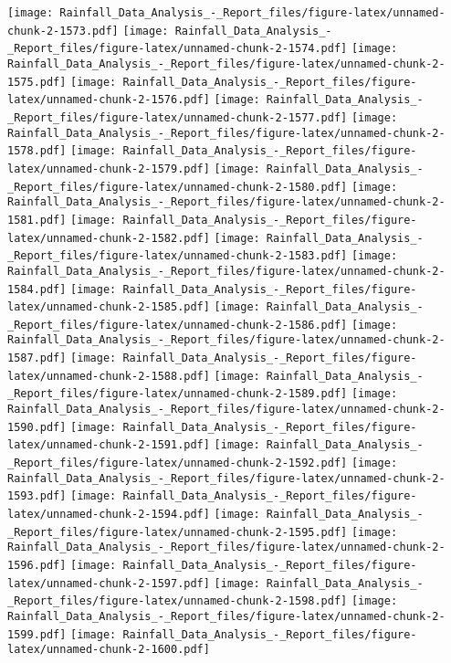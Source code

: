 \documentclass[
]{article}
\begin{document}
\texttt{[image: Rainfall\_Data\_Analysis\_-\_Report\_files/figure-latex/unnamed-chunk-2-1573.pdf]}
\texttt{[image: Rainfall\_Data\_Analysis\_-\_Report\_files/figure-latex/unnamed-chunk-2-1574.pdf]}
\texttt{[image: Rainfall\_Data\_Analysis\_-\_Report\_files/figure-latex/unnamed-chunk-2-1575.pdf]}
\texttt{[image: Rainfall\_Data\_Analysis\_-\_Report\_files/figure-latex/unnamed-chunk-2-1576.pdf]}
\texttt{[image: Rainfall\_Data\_Analysis\_-\_Report\_files/figure-latex/unnamed-chunk-2-1577.pdf]}
\texttt{[image: Rainfall\_Data\_Analysis\_-\_Report\_files/figure-latex/unnamed-chunk-2-1578.pdf]}
\texttt{[image: Rainfall\_Data\_Analysis\_-\_Report\_files/figure-latex/unnamed-chunk-2-1579.pdf]}
\texttt{[image: Rainfall\_Data\_Analysis\_-\_Report\_files/figure-latex/unnamed-chunk-2-1580.pdf]}
\texttt{[image: Rainfall\_Data\_Analysis\_-\_Report\_files/figure-latex/unnamed-chunk-2-1581.pdf]}
\texttt{[image: Rainfall\_Data\_Analysis\_-\_Report\_files/figure-latex/unnamed-chunk-2-1582.pdf]}
\texttt{[image: Rainfall\_Data\_Analysis\_-\_Report\_files/figure-latex/unnamed-chunk-2-1583.pdf]}
\texttt{[image: Rainfall\_Data\_Analysis\_-\_Report\_files/figure-latex/unnamed-chunk-2-1584.pdf]}
\texttt{[image: Rainfall\_Data\_Analysis\_-\_Report\_files/figure-latex/unnamed-chunk-2-1585.pdf]}
\texttt{[image: Rainfall\_Data\_Analysis\_-\_Report\_files/figure-latex/unnamed-chunk-2-1586.pdf]}
\texttt{[image: Rainfall\_Data\_Analysis\_-\_Report\_files/figure-latex/unnamed-chunk-2-1587.pdf]}
\texttt{[image: Rainfall\_Data\_Analysis\_-\_Report\_files/figure-latex/unnamed-chunk-2-1588.pdf]}
\texttt{[image: Rainfall\_Data\_Analysis\_-\_Report\_files/figure-latex/unnamed-chunk-2-1589.pdf]}
\texttt{[image: Rainfall\_Data\_Analysis\_-\_Report\_files/figure-latex/unnamed-chunk-2-1590.pdf]}
\texttt{[image: Rainfall\_Data\_Analysis\_-\_Report\_files/figure-latex/unnamed-chunk-2-1591.pdf]}
\texttt{[image: Rainfall\_Data\_Analysis\_-\_Report\_files/figure-latex/unnamed-chunk-2-1592.pdf]}
\texttt{[image: Rainfall\_Data\_Analysis\_-\_Report\_files/figure-latex/unnamed-chunk-2-1593.pdf]}
\texttt{[image: Rainfall\_Data\_Analysis\_-\_Report\_files/figure-latex/unnamed-chunk-2-1594.pdf]}
\texttt{[image: Rainfall\_Data\_Analysis\_-\_Report\_files/figure-latex/unnamed-chunk-2-1595.pdf]}
\texttt{[image: Rainfall\_Data\_Analysis\_-\_Report\_files/figure-latex/unnamed-chunk-2-1596.pdf]}
\texttt{[image: Rainfall\_Data\_Analysis\_-\_Report\_files/figure-latex/unnamed-chunk-2-1597.pdf]}
\texttt{[image: Rainfall\_Data\_Analysis\_-\_Report\_files/figure-latex/unnamed-chunk-2-1598.pdf]}
\texttt{[image: Rainfall\_Data\_Analysis\_-\_Report\_files/figure-latex/unnamed-chunk-2-1599.pdf]}
\texttt{[image: Rainfall\_Data\_Analysis\_-\_Report\_files/figure-latex/unnamed-chunk-2-1600.pdf]}
\end{document}
